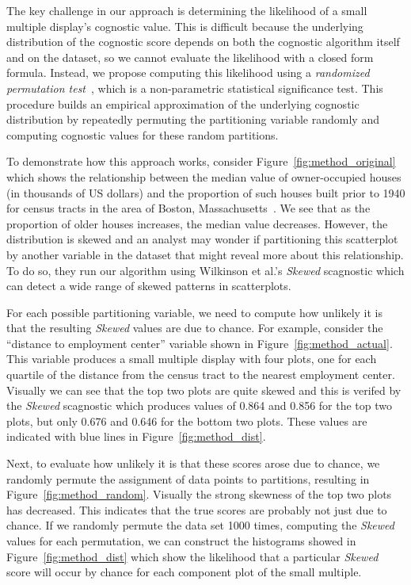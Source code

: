 The key challenge in our approach is determining the likelihood of a small multiple display's cognostic value. This is difficult because the underlying distribution of the cognostic score depends on both the cognostic algorithm itself and on the dataset, so we cannot evaluate the likelihood with a closed form formula. Instead, we propose computing this likelihood using a \emph{randomized permutation test}~\cite{Good2000}, which is a non-parametric statistical significance test. This procedure builds an empirical approximation of the underlying cognostic distribution by repeatedly permuting the partitioning variable randomly and computing cognostic values for these random partitions.

To demonstrate how this approach works, consider
Figure~\ref{fig:method_original} which shows the relationship between the median value of owner-occupied houses (in thousands of US dollars) and the proportion of such houses built prior to 1940 for census tracts in the area of Boston, Massachusetts~\cite{Harrison1978}. We see that as the proportion of older houses increases, the median value decreases. However, the distribution is skewed and an analyst may wonder if partitioning this scatterplot by another variable in the dataset that might reveal more about this relationship.
To do so, they run our algorithm using Wilkinson et al.'s \emph{Skewed} scagnostic which can detect a wide range of skewed patterns in scatterplots.

For each possible partitioning variable, we need to compute how unlikely it is that the resulting \emph{Skewed} values are due to chance. For example, consider the ``distance to employment center'' variable shown in Figure~\ref{fig:method_actual}. This variable produces a small multiple display with four plots, one for each quartile of the distance from the census tract to the nearest employment center. Visually we can see that the top two plots are quite skewed and this is verifed by the \emph{Skewed} scagnostic which produces values of 0.864 and 0.856 for the top two plots, but only 0.676 and 0.646 for the bottom two plots. These values are indicated with blue lines in  Figure~\ref{fig:method_dist}.

Next, to evaluate how unlikely it is that these scores arose due to chance, we randomly permute the assignment of data points to partitions, resulting in Figure~\ref{fig:method_random}. Visually the strong skewness of the top two plots has decreased. This indicates that the true scores are probably not just due to chance. If we randomly permute the data set 1000 times, computing the \emph{Skewed} values for each permutation, we can construct the histograms showed in Figure~\ref{fig:method_dist} which show the likelihood that a particular \emph{Skewed} score will occur by chance for each component plot of the small multiple.

